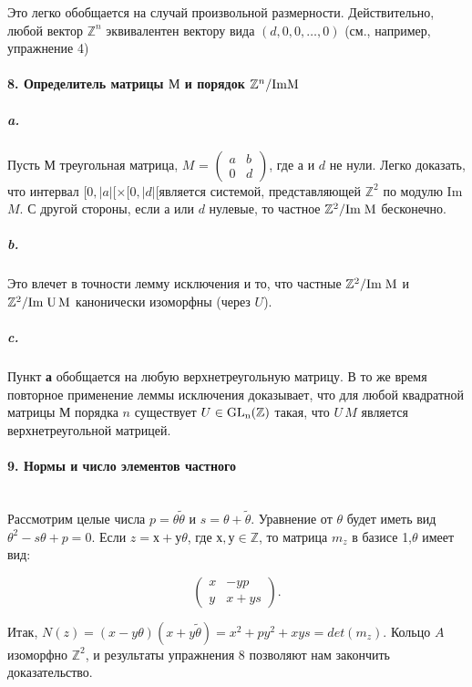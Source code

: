 \documentclass{mai_book}
\begin{document}
{Это легко обобщается на случай произвольной размерности. Действительно, любой вектор $\mathbb {Z}^n$ эквивалентен вектору вида $(d,0,0,\ldots,0)$ (см., например, упражнение 4)

\paragraph{8. Определитель матрицы $М$ и порядок $\mathbb {Z}^{n}/{\rm{Im}{M}}$}

\subparagraph{a.} Пусть $М$ треугольная матрица, $M$ = $\begin{pmatrix} a & b \\ 0 & d \end{pmatrix}$, где $а$ и $d$ не нули. Легко доказать, что интервал $[0,|a|[\times[0,|d|$[является системой, представляющей $\mathbb {Z}^2$ по модулю Im{$M$}. С другой стороны, если $а$ или $d$ нулевые, то частное $\mathbb {Z}^2/\rm{Im\;{M}}$ бесконечно. \subparagraph{b.} Это влечет в точности лемму исключения и то, что частные $\mathbb {Z}^2/\rm{Im\;{M}}$ и $\mathbb {Z}^2/\rm{Im\;{U\,M}}$ канонически изоморфны (через $U$).

\subparagraph{c.} Пункт {\bf а} обобщается на любую верхнетреугольную матрицу. В то же время повторное применение леммы исключения доказывает, что для любой квадратной матрицы $М$ порядка $n$ существует $U \in \rm{GL_{n}}(\mathbb {Z})$ такая, что $U\,M$ является верхнетреугольной матрицей.

\paragraph{9. Нормы и число элементов частного} \mbox{}\\

Рассмотрим целые числа $p = \theta\tilde{\theta}$ и $s = \theta + \tilde{\theta}$. Уравнение от $\theta$ будет иметь вид $\theta^{2} - s\theta + p = 0$. Если $z = х + у\theta$, где $х,у \in \mathbb {Z}$, то матрица $m_{z}$ в базисе {1,$\theta$} имеет вид:

\begin{equation*}
\begin{pmatrix} x & -yp \\ y & x + ys \end{pmatrix}.
\end{equation*}

\noindent Итак, $N(z) = (x - y{\theta})(x + y\tilde{\theta}) = x^2 + py^2 + xys = det(m_{z})$. Кольцо $A$ изоморфно $\mathbb {Z}^2$, и результаты упражнения 8 позволяют нам закончить доказательство.



}
\end{document}
